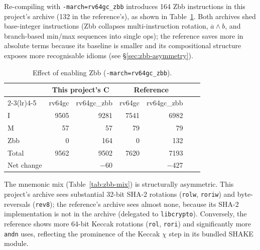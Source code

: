 \documentclass[11pt,a4paper]{article}
\begin{document}
Re-compiling with \texttt{-march=rv64gc\_zbb} introduces 164 Zbb
instructions in this project's archive (132 in the reference's), as
shown in Table~\ref{tab:zbb-headline}. Both archives shed base-integer
instructions (Zbb collapses multi-instruction rotation, $\overline{a}
\land b$, and branch-based min/max sequences into single ops); the
reference saves more in absolute terms because its baseline is
smaller and its compositional structure exposes more
recognisable idioms (see \S\ref{sec:zbb-asymmetry}).

\begin{table}[ht]
\centering
\caption{Effect of enabling Zbb (\texttt{-march=rv64gc\_zbb}).}
\label{tab:zbb-headline}
\begin{tabular}{@{}lrrrrrr@{}}
\toprule
                & \multicolumn{2}{c}{This project's C} & \multicolumn{2}{c}{Reference} \\
\cmidrule(lr){2-3}\cmidrule(lr){4-5}
                & rv64gc & rv64gc\_zbb & rv64gc & rv64gc\_zbb \\
\midrule
I               & 9505 & 9281  & 7541 & 6982 \\
M               &   57 &   57  &   79 &   79 \\
Zbb             &    0 &  164  &    0 &  132 \\
Total           & 9562 & 9502  & 7620 & 7193 \\
\midrule
Net change      &      & $-$60 &      & $-$427 \\
\bottomrule
\end{tabular}
\end{table}

The mnemonic mix (Table~\ref{tab:zbb-mix}) is structurally
asymmetric. This project's archive sees substantial 32-bit SHA-2
rotations (\texttt{rolw}, \texttt{roriw}) and byte-reversals
(\texttt{rev8}); the reference's archive sees almost none, because
its SHA-2 implementation is not in the archive (delegated to
\texttt{libcrypto}). Conversely, the reference shows more 64-bit
Keccak rotations (\texttt{rol}, \texttt{rori}) and significantly more
\texttt{andn} uses, reflecting the prominence of the Keccak $\chi$
step in its bundled SHAKE module.
\end{document}
